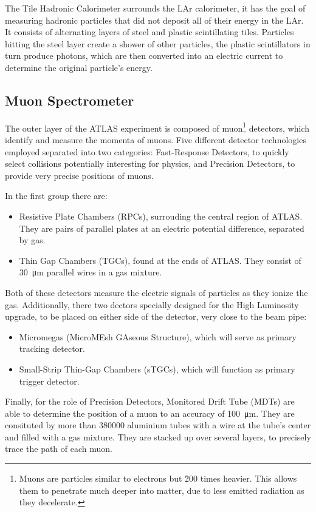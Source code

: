 The Tile Hadronic Calorimeter surrounds the LAr calorimeter, it has the goal of measuring hadronic particles that did not deposit all of their energy in the LAr. It consists of alternating layers of steel and plastic scintillating tiles. Particles hitting the steel layer create a shower of other particles, the plastic scintillators in turn produce photons, which are then converted into an electric current to determine the original particle's energy.


\subsection{Muon Spectrometer}\label{sec:muon_spectrometer}

The outer layer of the ATLAS experiment is composed of muon\footnote{Muons are particles similar to electrons but \~200 times heavier. This allows them to penetrate much deeper into matter, due to less emitted radiation as they decelerate.} detectors, which identify and measure the momenta of muons. Five different detector technologies employed separated into two categories: Fast-Response Detectors, to quickly select collisions potentially interesting for physics, and Precision Detectors, to provide very precise positions of muons.

In the first group there are: 
\begin{itemize}
    \item Resistive Plate Chambers (RPCs), surrouding the central region of ATLAS. They are pairs of parallel plates at an electric potential difference, separated by gas.
    \item Thin Gap Chambers (TGCs), found at the ends of ATLAS. They consist of \qty{30}{\micro\meter} parallel wires in a gas mixture.
\end{itemize}
Both of these detectors measure the electric signals of particles as they ionize the gas. Additionally, there two dectors\cite{KOULOURIS2020162757} specially designed for the High Luminosity upgrade, to be placed on either side of the detector, very close to the beam pipe:
\begin{itemize}
    \item Micromegas (MicroMEsh GAseous Structure), which will serve as primary tracking detector.
    \item Small-Strip Thin-Gap Chambers (sTGCs), which will function as primary trigger detector.
\end{itemize}

Finally, for the role of Precision Detectors, Monitored Drift Tube (MDTs) are able to determine the position of a muon to an accuracy of \qty{100}{\micro\meter}. They are consituted by more than \num{380000} aluminium tubes with a wire at the tube's center and filled with a gas mixture. They are stacked up over several layers, to precisely trace the path of each muon.


